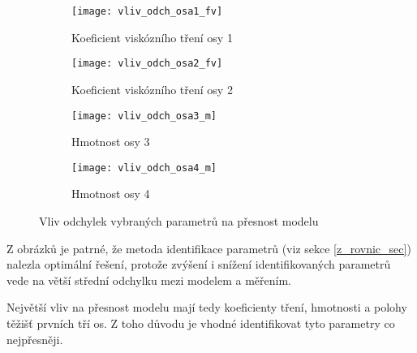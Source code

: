 \begin{figure}[h]
    \centering
    \begin{subfigure}[b]{1\textwidth}
        \texttt{[image: vliv\_odch\_osa1\_fv]}
        \caption{Koeficient viskózního tření osy 1}
        \label{vliv_odch_1}
    \end{subfigure}
    \begin{subfigure}[b]{1\textwidth}
        \texttt{[image: vliv\_odch\_osa2\_fv]}
        \caption{Koeficient viskózního tření osy 2}
        \label{vliv_odch_2}
    \end{subfigure}
    \begin{subfigure}[b]{1\textwidth}
        \texttt{[image: vliv\_odch\_osa3\_m]}
        \caption{Hmotnost osy 3}
        \label{vliv_odch_3}
    \end{subfigure}
    \begin{subfigure}[b]{1\textwidth}
        \texttt{[image: vliv\_odch\_osa4\_m]}
        \caption{Hmotnost osy 4}
        \label{vliv_odch_4}
    \end{subfigure}
    \caption{Vliv odchylek vybraných parametrů na přesnost modelu}
\end{figure} 

\clearpage

Z obrázků je patrné, že metoda identifikace parametrů (viz sekce \ref{z_rovnic_sec}) nalezla optimální řešení, protože zvýšení i snížení identifikovaných parametrů vede na větší střední odchylku mezi modelem a měřením. 

Největší vliv na přesnost modelu mají tedy koeficienty tření, hmotnosti a polohy těžišť prvních tří os. Z toho důvodu je vhodné identifikovat tyto parametry co nejpřesněji.   